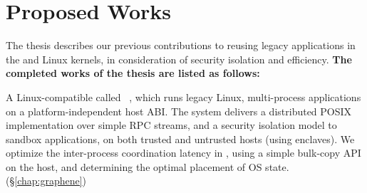 \chapter{Proposed Works}
\label{chap:proposal}

The thesis describes our previous contributions
to reusing legacy applications in the \graphene{} \libos{} and Linux kernels,
in consideration of security isolation and efficiency.
{\bf The completed works of the thesis are listed as follows:}

\vspace{\baselineskip}
\begin{compactitem}

\item A Linux-compatible \libos{} called \term{\graphene{}}~\citep{tsai14graphene},
which runs legacy Linux, multi-process applications on a platform-independent host ABI.
The system delivers a distributed POSIX implementation
over simple RPC streams,
and a security isolation model to sandbox applications,
on both trusted and untrusted hosts (using \sgx{} enclaves).
We optimize
the inter-process coordination latency in \graphene{},
using a simple bulk-copy API on the host, and determining the optimal placement of OS state.
(\S\ref{chap:graphene})


\end{compactitem}

